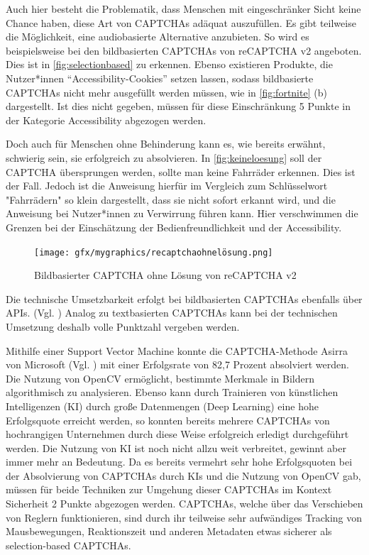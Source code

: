 Auch hier besteht die Problematik, dass Menschen mit eingeschränker Sicht keine Chance haben, diese Art von CAPTCHAs adäquat auszufüllen.
Es gibt teilweise die Möglichkeit, eine audiobasierte Alternative anzubieten. 
So wird es beispielsweise bei den bildbasierten CAPTCHAs von reCAPTCHA v2 angeboten. 
Dies ist in \autoref{fig:selectionbased} zu erkennen.
Ebenso existieren Produkte, die Nutzer*innen ``Accessibility-Cookies'' setzen lassen, 
sodass bildbasierte CAPTCHAs nicht mehr ausgefüllt werden müssen, wie in \autoref{fig:fortnite} (b) dargestellt.
Ist dies nicht gegeben, müssen für diese Einschränkung 5 Punkte in der Kategorie Accessibility abgezogen werden.

Doch auch für Menschen ohne Behinderung kann es, wie bereits erwähnt, schwierig sein, sie erfolgreich zu absolvieren.
In \autoref{fig:keineloesung} soll der CAPTCHA übersprungen werden, sollte man keine Fahrräder erkennen.
Dies ist der Fall. 
Jedoch ist die Anweisung hierfür im Vergleich zum Schlüsselwort "Fahrrädern" so klein dargestellt, dass sie nicht sofort erkannt wird,
und die Anweisung bei Nutzer*innen zu Verwirrung führen kann.
Hier verschwimmen die Grenzen bei der Einschätzung der Bedienfreundlichkeit und der Accessibility.

\begin{figure}[h!]
    \centering
    \texttt{[image: gfx/mygraphics/recaptchaohnelösung.png]}
    \caption{Bildbasierter CAPTCHA ohne Lösung von reCAPTCHA v2}   
    \label{fig:keineloesung}
\end{figure}

Die technische Umsetzbarkeit erfolgt bei bildbasierten CAPTCHAs ebenfalls über APIs. (Vgl. \cite{hcaptcha} \cite{arkoselabs} \cite{geetest})
Analog zu textbasierten CAPTCHAs kann bei der technischen Umsetzung deshalb volle Punktzahl vergeben werden.

Mithilfe einer Support Vector Machine konnte die CAPTCHA-Methode Asirra von Microsoft (Vgl. \cite{elson2007asirra})
mit einer Erfolgsrate von 82,7 Prozent absolviert werden. 
Die Nutzung von OpenCV ermöglicht, bestimmte Merkmale in Bildern algorithmisch zu analysieren.
Ebenso kann durch Trainieren von künstlichen Intelligenzen (KI) durch große Datenmengen (Deep Learning) eine hohe Erfolgsquote erreicht werden,
so konnten bereits mehrere CAPTCHAs von hochrangigen Unternehmen durch diese Weise erfolgreich erledigt durchgeführt werden.
Die Nutzung von KI ist noch nicht allzu weit verbreitet, gewinnt aber immer mehr an Bedeutung.
Da es bereits vermehrt sehr hohe Erfolgsquoten bei der Absolvierung von CAPTCHAs durch KIs und die Nutzung von OpenCV gab,
müssen für beide Techniken zur Umgehung dieser CAPTCHAs im Kontext Sicherheit 2 Punkte abgezogen werden.
CAPTCHAs, welche über das Verschieben von Reglern funktionieren, sind durch ihr teilweise sehr aufwändiges Tracking von Mausbewegungen,
Reaktionszeit und anderen Metadaten etwas sicherer als selection-based CAPTCHAs. \cite[p.77f]{surveyofresearch}

